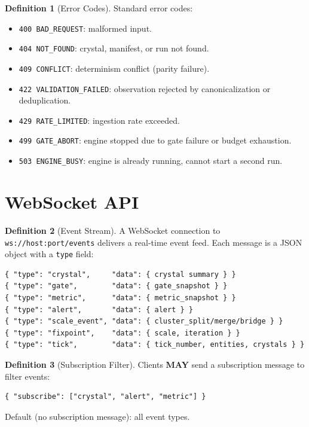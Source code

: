 \documentclass[11pt,a4paper,twoside]{article}
\theoremstyle{definition}
\newtheorem{definition}{Definition}[section]
\theoremstyle{plain}
\theoremstyle{remark}
\begin{document}
\begin{definition}[Error Codes]\label{def:errors}
Standard error codes:
\begin{itemize}[nosep]
  \item \texttt{400 BAD\_REQUEST}: malformed input.
  \item \texttt{404 NOT\_FOUND}: crystal, manifest, or run not found.
  \item \texttt{409 CONFLICT}: determinism conflict (parity failure).
  \item \texttt{422 VALIDATION\_FAILED}: observation rejected by
        canonicalization or deduplication.
  \item \texttt{429 RATE\_LIMITED}: ingestion rate exceeded.
  \item \texttt{499 GATE\_ABORT}: engine stopped due to gate failure
        or budget exhaustion.
  \item \texttt{503 ENGINE\_BUSY}: engine is already running, cannot
        start a second run.
\end{itemize}
\end{definition}


\section{WebSocket API}\label{sec:gw:ws}

\begin{definition}[Event Stream]\label{def:eventstream}
A WebSocket connection to \texttt{ws://host:port/events} delivers a
real-time event feed. Each message is a JSON object with a
\texttt{type} field:

\begin{lstlisting}
{ "type": "crystal",     "data": { crystal summary } }
{ "type": "gate",        "data": { gate_snapshot } }
{ "type": "metric",      "data": { metric_snapshot } }
{ "type": "alert",       "data": { alert } }
{ "type": "scale_event", "data": { cluster_split/merge/bridge } }
{ "type": "fixpoint",    "data": { scale, iteration } }
{ "type": "tick",        "data": { tick_number, entities, crystals } }
\end{lstlisting}
\end{definition}

\begin{definition}[Subscription Filter]\label{def:subfilter}
Clients \textbf{MAY} send a subscription message to filter events:
\begin{lstlisting}
{ "subscribe": ["crystal", "alert", "metric"] }
\end{lstlisting}
Default (no subscription message): all event types.
\end{definition}
\end{document}
